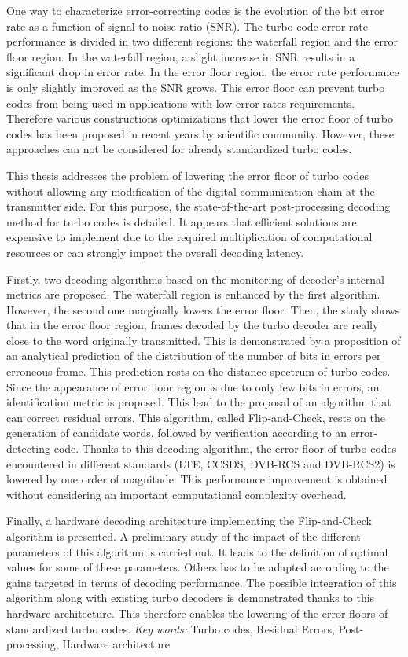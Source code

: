 One way to characterize error-correcting codes is the evolution of the bit error rate as a function of signal-to-noise ratio (SNR). The turbo code error rate performance is divided in two different regions: the waterfall region and the error floor region. In the waterfall region, a slight increase in SNR results in a significant drop in error rate. In the error floor region, the error rate performance is only slightly improved as the SNR grows. This error floor can prevent turbo codes from being used in applications with low error rates requirements. Therefore various constructions optimizations that lower the error floor of turbo codes has been proposed in recent years by scientific community. However, these approaches can not be considered for already standardized turbo codes.

This thesis addresses the problem of lowering the error floor of turbo codes without allowing any modification of the digital communication chain at the transmitter side. For this purpose, the state-of-the-art post-processing decoding method for turbo codes is detailed. It appears that efficient solutions are expensive to implement due to the required multiplication of computational resources or can strongly impact the overall decoding latency.

Firstly, two decoding algorithms based on the monitoring of decoder's internal metrics are proposed. The waterfall region is enhanced by the first algorithm. However, the second one marginally lowers the error floor. Then, the study shows that in the error floor region, frames decoded by the turbo decoder are really close to the word originally transmitted. This is demonstrated by a proposition of an analytical prediction of the distribution of the number of bits in errors per erroneous frame. This prediction rests on the distance spectrum of turbo codes. Since the appearance of error floor region is due to only few bits in errors, an identification metric is proposed. This lead to the proposal of an algorithm that can correct residual errors. This algorithm, called Flip-and-Check, rests on the generation of candidate words, followed by verification according to an error-detecting code. Thanks to this decoding algorithm, the error floor of turbo codes encountered in different standards (LTE, CCSDS, DVB-RCS and DVB-RCS2) is lowered by one order of magnitude. This performance improvement is obtained without considering an important computational complexity overhead.

Finally, a hardware decoding architecture implementing the Flip-and-Check algorithm is presented. A preliminary study of the impact of the different parameters of this algorithm is carried out. It leads to the definition of optimal values for some of these parameters. Others has to be adapted according to the gains targeted in terms of decoding performance. The possible integration of this algorithm along with existing turbo decoders is demonstrated thanks to this hardware architecture. This therefore enables the lowering of the error floors of standardized turbo codes.
\vskip0.5cm
\emph{Key words:} Turbo codes, Residual Errors, Post-processing, Hardware architecture
